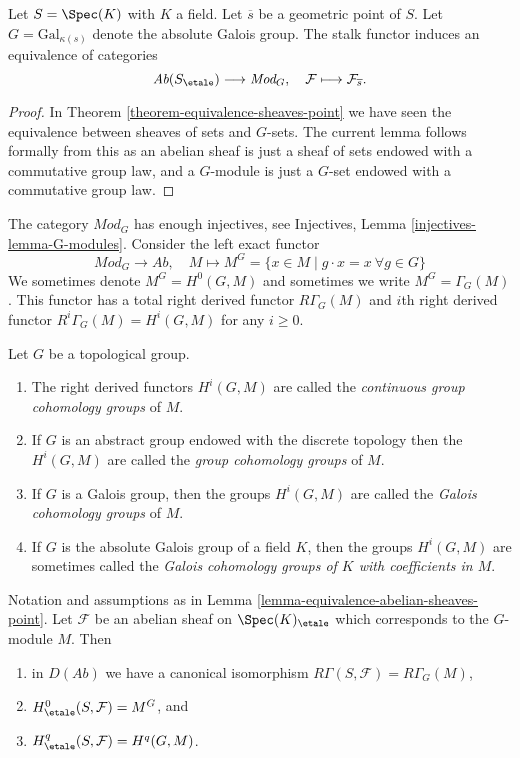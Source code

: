 \begin{lemma}
\label{lemma-equivalence-abelian-sheaves-point}
Let $S = \Spec(K)$ with $K$ a field.
Let $\overline{s}$ be a geometric point of $S$.
Let $G = \text{Gal}_{\kappa(s)}$ denote the absolute Galois group.
The stalk functor induces an equivalence of categories
$$
\textit{Ab}(S_\etale) \longrightarrow \textit{Mod}_G,
\quad
\mathcal{F} \longmapsto \mathcal{F}_{\overline{s}}.
$$
\end{lemma}

\begin{proof}
In
Theorem \ref{theorem-equivalence-sheaves-point}
we have seen the equivalence between sheaves of sets and $G$-sets.
The current lemma follows formally from this as an abelian sheaf is just
a sheaf of sets endowed with a commutative group law, and a $G$-module
is just a $G$-set endowed with a commutative group law.
\end{proof}

\noindent
The category $\textit{Mod}_G$ has enough injectives, see
Injectives, Lemma \ref{injectives-lemma-G-modules}.
Consider the left exact functor
$$
\textit{Mod}_G \longrightarrow \textit{Ab},
\quad
M \longmapsto M^G =
\{x \in M \mid g \cdot x = x\ \forall g \in G\}
$$
We sometimes denote $M^G = H^0(G, M)$ and sometimes we write
$M^G = \Gamma_G(M)$. This functor has a total right derived functor
$R\Gamma_G(M)$ and $i$th right derived functor
$R^i\Gamma_G(M) = H^i(G, M)$ for any $i \geq 0$.

\begin{definition}
\label{definition-galois-cohomology}
Let $G$ be a topological group.
\begin{enumerate}
\item The right derived functors $H^i(G, M)$ are called the
{\it continuous group cohomology groups} of $M$.
\item If $G$ is an abstract group endowed with the discrete topology
then the $H^i(G, M)$ are called the {\it group cohomology groups} of $M$.
\item If $G$ is a Galois group, then the groups $H^i(G, M)$ are called
the {\it Galois cohomology groups} of $M$.
\item If $G$ is the absolute Galois group of a field $K$, then the groups
$H^i(G, M)$ are sometimes called the {\it Galois cohomology groups of $K$
with coefficients in $M$}.
\end{enumerate}
\end{definition}

\begin{lemma}
\label{lemma-compare-cohomology-point}
Notation and assumptions as in
Lemma \ref{lemma-equivalence-abelian-sheaves-point}.
Let $\mathcal{F}$ be an abelian sheaf on $\Spec(K)_\etale$
which corresponds to the $G$-module $M$.
Then
\begin{enumerate}
\item in $D(\textit{Ab})$ we have a canonical isomorphism
$R\Gamma(S, \mathcal{F}) = R\Gamma_G(M)$,
\item $H_\etale^0(S, \mathcal{F}) = M^G$, and
\item $H_\etale^q(S, \mathcal{F}) = H^q(G, M)$.
\end{enumerate}
\end{lemma}

